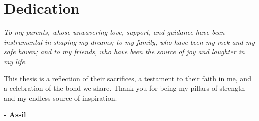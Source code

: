 \chapter*{\hfill Dedication \hfill}

\vspace{3cm}

\noindent
\textit{To my parents, whose unwavering love, support, and guidance have been instrumental in shaping my dreams; to my family, who have been my rock and my safe haven; and to my friends, who have been the source of joy and laughter in my life.}

\noindent
This thesis is a reflection of their sacrifices, a testament to their faith in me, and a celebration of the bond we share. Thank you for being my pillars of strength and my endless source of inspiration.\\

\begin{flushright}
  \textbf{- Assil}
\end{flushright}